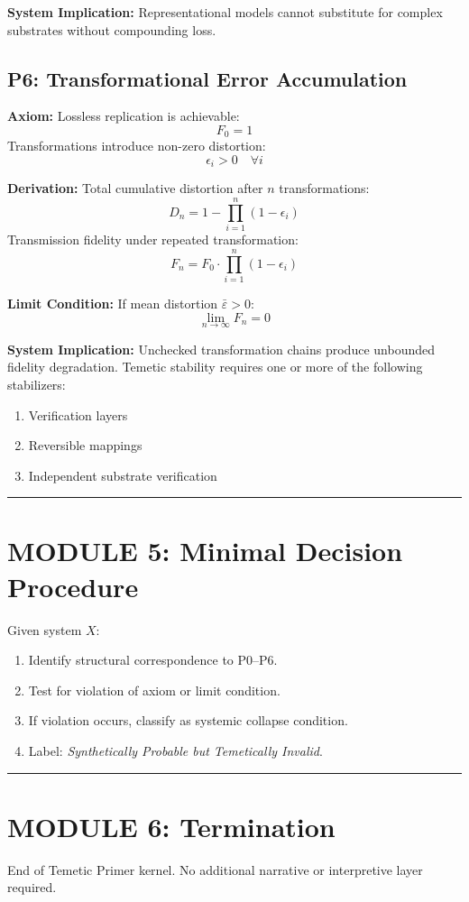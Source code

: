 \documentclass{article}
\begin{document}
\textbf{System Implication:} Representational models cannot substitute for complex
substrates without compounding loss.

\bigskip

\subsection*{P6: Transformational Error Accumulation}

\textbf{Axiom:} Lossless replication is achievable:
\[ F_0 = 1 \]
Transformations introduce non-zero distortion:
\[ \epsilon_i > 0 \quad \forall i \]

\textbf{Derivation:} Total cumulative distortion after $n$ transformations:
\[ D_n = 1 - \prod_{i=1}^{n}(1 - \epsilon_i) \]
Transmission fidelity under repeated transformation:
\[ F_n = F_0 \cdot \prod_{i=1}^{n}(1 - \epsilon_i) \]

\textbf{Limit Condition:} If mean distortion $\bar{\varepsilon} > 0$:
\[ \lim_{n \to \infty} F_n = 0 \]

\textbf{System Implication:} Unchecked transformation chains produce unbounded
fidelity degradation. Temetic stability requires one or more of the following
stabilizers:
\begin{enumerate}
    \item Verification layers
    \item Reversible mappings
    \item Independent substrate verification
\end{enumerate}

\bigskip
\hrule
\bigskip

\section*{MODULE 5: Minimal Decision Procedure}

Given system $X$:

\begin{enumerate}
    \item Identify structural correspondence to P0--P6.
    \item Test for violation of axiom or limit condition.
    \item If violation occurs, classify as systemic collapse condition.
    \item Label: \textit{Synthetically Probable but Temetically Invalid}.
\end{enumerate}

\bigskip
\hrule
\bigskip

\section*{MODULE 6: Termination}

End of Temetic Primer kernel. No additional narrative or interpretive layer required.
\end{document}

